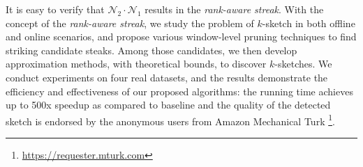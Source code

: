 
It is easy to verify that $\mathcal{N}_2 \cdot \mathcal{N}_1$ results in the \emph{rank-aware streak}.
With the concept of the \emph{rank-aware streak}, we study the problem of $k$-sketch in both
offline and online scenarios, and propose various window-level 
pruning techniques to find striking candidate steaks.
Among those candidates, we then develop approximation
methods, with theoretical bounds, to discover $k$-sketches. We conduct experiments on four real
datasets, and the results demonstrate the efficiency and 
effectiveness of our proposed algorithms: the running time
achieves up to 500x speedup as compared to baseline and the quality of the
detected sketch is endorsed by the anonymous users
from Amazon Mechanical Turk \footnote{\url{https://requester.mturk.com}}.

